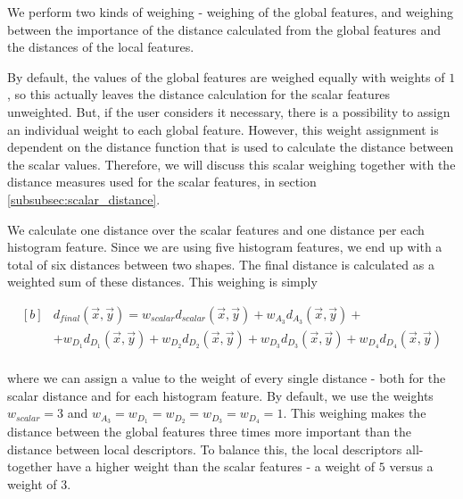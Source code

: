 We perform two kinds of weighing - weighing of the global features, and weighing between the importance of the distance
calculated from the global features and the distances of the local features.

By default, the values of the global features are weighed equally with weights of $1$, so this actually leaves the
distance calculation for the scalar features unweighted.
But, if the user considers it necessary, there is a possibility to assign an individual weight to each global feature.
However, this weight assignment is dependent on the distance function that is used to calculate the distance between
the scalar values.
Therefore, we will discuss this scalar weighing together with the distance measures used for the scalar features, in
section \ref{subsubsec:scalar_distance}.

We calculate one distance over the scalar features and one distance per each histogram feature.
Since we are using five histogram features, we end up with a total of six distances between two shapes.
The final distance is calculated as a weighted sum of these distances.
This weighing is simply

\begin{equation}
    \begin{aligned}[b]
    & d_{final}(\overrightarrow{x}, \overrightarrow{y}) = w_{scalar} d_{scalar}(\overrightarrow{x}, \overrightarrow{y}) + w_{A_3} d_{A_3}(\overrightarrow{x}, \overrightarrow{y}) + \\
    & + w_{D_1} d_{D_1}(\overrightarrow{x}, \overrightarrow{y}) + w_{D_2} d_{D_2}(\overrightarrow{x}, \overrightarrow{y}) + w_{D_3} d_{D_3}(\overrightarrow{x}, \overrightarrow{y}) + w_{D_4} d_{D_4}(\overrightarrow{x}, \overrightarrow{y}) \\
    \end{aligned}
    \label{eq:weighing}
\end{equation}

where we can assign a value to the weight of every single distance - both for the scalar distance and for each histogram feature.
By default, we use the weights $w_{scalar} = 3$ and $w_{A_3} = w_{D_1} = w_{D_2} = w_{D_3} = w_{D_4} = 1$.
This weighing makes the distance between the global features three times more important than the distance between local descriptors.
To balance this, the local descriptors all-together have a higher weight than the scalar features - a weight of $5$ versus a weight of $3$.

